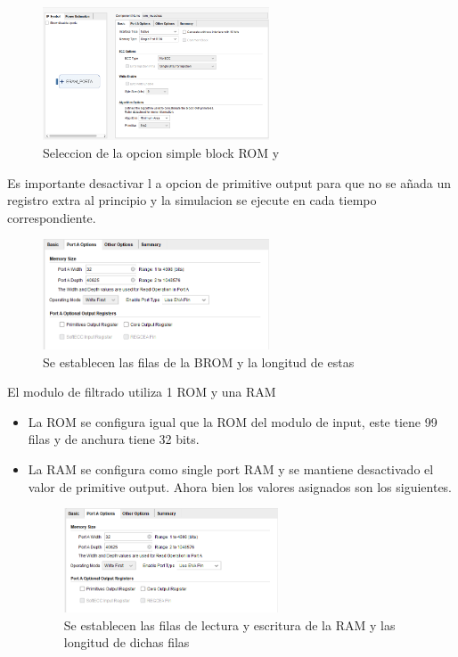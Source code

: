 \begin{figure}[h!]
    \centering
    \includegraphics[width=0.6\textwidth]{./Images/img_implementacion_hw/rom_muestras_1.png}
    \caption{Seleccion de la opcion simple block ROM y}
    \label{fig:rom_muestras_1}
\end{figure}
 Es importante desactivar l a opcion de primitive output para que no se añada un registro extra 
 al principio y la simulacion se ejecute en cada tiempo correspondiente. 
\begin{figure}[h!]
    \centering
    \includegraphics[width=0.6\textwidth]{./Images/img_implementacion_hw/rom_muestras_2.png}
    \caption{Se establecen las filas de la BROM y la longitud de estas}
    \label{fig:rom_muestras_2}
\end{figure}

El modulo de filtrado utiliza 1 ROM y una RAM

\begin{itemize}
\item La ROM se configura igual que la ROM del modulo de input, este tiene 99 filas y de anchura 
tiene 32 bits.
\item La RAM se configura como single port RAM y se mantiene desactivado el valor de primitive output.
 Ahora bien los valores asignados son los siguientes.
 
\begin{figure}[h!]
    \centering
    \includegraphics[width=0.6\textwidth]{./Images/img_implementacion_hw/rom_muestras_2.png}
    \caption{Se establecen las filas de lectura y escritura de la RAM y las longitud de dichas filas}
    \label{fig:ram_muestras_1}
\end{figure}

\end{itemize}
